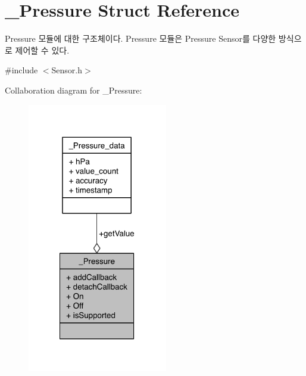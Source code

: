 \hypertarget{struct__Pressure}{\section{\-\_\-\-Pressure Struct Reference}
\label{struct__Pressure}
}


Pressure 모듈에 대한 구조체이다. Pressure 모듈은 Pressure Sensor를 다양한 방식으로 제어할 수 있다.  




{\ttfamily \#include $<$Sensor.\-h$>$}



Collaboration diagram for \-\_\-\-Pressure\-:\nopagebreak
\begin{figure}[H]
\begin{center}
\leavevmode
\includegraphics[width=173pt]{d8/df1/struct__Pressure__coll__graph}
\end{center}
\end{figure}
